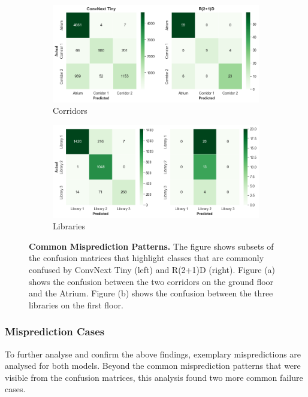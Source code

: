 \documentclass[a4paper]{article}
\begin{document}
\begin{figure}
  \centering
  \begin{subfigure}[b]{\textwidth}
    \includegraphics[width=\textwidth]{./figures/conf-matrix-corridors.png}
    \caption{Corridors}
  \end{subfigure}
  \vspace{.5cm}
  \begin{subfigure}[b]{\textwidth}
    \includegraphics[width=\textwidth]{./figures/conf-matrix-libraries.png}
    \caption{Libraries}
  \end{subfigure}
  \caption{
    \textbf{Common Misprediction Patterns.} The figure shows subsets of the
    confusion matrices that highlight classes that are commonly confused by
    ConvNext Tiny (left) and R(2+1)D (right). Figure (a) shows the confusion
    between the two corridors on the ground floor and the Atrium. Figure (b)
    shows the confusion between the three libraries on the first floor. 
  }
  \label{fig:conf-matrix-challenging}
\end{figure}

\subsubsection{Misprediction Cases} %
\label{sub:mispredictons}

To further analyse and confirm the above findings, exemplary mispredictions are
analysed for both models. Beyond the common misprediction patterns that were
visible from the confusion matrices, this analysis found two more common failure
cases.
\end{document}
